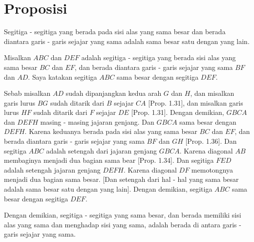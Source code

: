 \documentclass[a4paper]{book}
\begin{document}
\section*{\centering Proposisi \thesection} 
Segitiga - segitiga yang berada pada sisi alas yang sama besar dan berada 
diantara garis - garis sejajar yang sama adalah sama besar satu dengan 
yang lain.  
\begin{center}
\end{center}
Misalkan $ABC$ dan $DEF$ adalah segitiga - segitiga yang berada sisi alas yang
sama besar $BC$ dan $EF$, dan berada diantara garis - garis sejajar yang sama
$BF$ dan $AD$. Saya katakan segitiga $ABC$ sama besar dengan segitiga $DEF$.

Sebab misalkan $AD$ sudah dipanjangkan kedua arah $G$ dan $H$, dan misalkan 
garis lurus $BG$ sudah ditarik dari $B$ sejajar $CA$ [Prop. 1.31], dan misalkan
garis lurus $HF$ sudah ditarik dari $F$ sejajar $DE$ [Prop. 1.31]. Dengan 
demikian, $GBCA$ dan $DEFH$ masing - masing jajaran genjang. Dan $GBCA$ sama 
besar dengan $DEFH$. Karena keduanya berada pada sisi alas yang sama besar 
$BC$ dan $EF$, dan berada diantara garis - garis sejajar yang sama $BF$ dan 
$GH$ [Prop. 1.36]. Dan segitiga $ABC$ adalah setengah dari jajaran genjang 
$GBCA$. Karena diagonal $AB$ membaginya menjadi dua bagian sama bear 
[Prop. 1.34]. Dan segitiga $FED$  adalah setengah jajaran genjang $DEFH$.
Karena diagonal $DF$ memotongnya menjadi dua bagian sama besar. [Dan setengah
dari hal - hal yang sama besar adalah sama besar satu dengan yang lain]. 
Dengan demikian, segitiga $ABC$ sama besar dengan segitiga $DEF$.

Dengan demikian, segitiga - segitiga yang sama besar, dan berada memiliki 
sisi alas yang sama
dan menghadap sisi yang sama, adalah berada di antara garis - garis sejajar 
yang sama.

\end{document}
